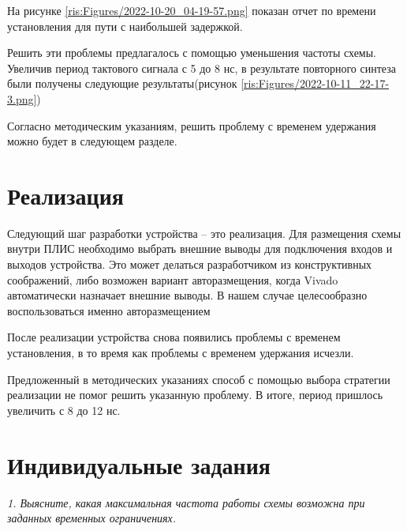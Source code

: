 \begin{sloppypar}
На рисунке \ref{ris:Figures/2022-10-20_04-19-57.png} показан отчет по времени установления для пути с наибольшей задержкой.

Решить эти проблемы предлагалось с помощью уменьшения частоты схемы. Увеличив период тактового сигнала с 5 до 8 нс, в результате повторного синтеза были получены следующие результаты(рисунок \ref{ris:Figures/2022-10-11_22-17-3.png})




Согласно методическим указаниям, решить проблему с временем удержания можно будет в следующем разделе.

\newpage
\section{Реализация} %
Следующий шаг разработки устройства – это реализация. Для размещения схемы внутри ПЛИС необходимо выбрать внешние выводы для подключения входов и выходов устройства. Это может делаться разработчиком из
конструктивных соображений, либо возможен вариант авторазмещения, когда Vivado автоматически назначает внешние выводы. В нашем случае целесообразно воспользоваться именно авторазмещением


После реализации устройства снова появились проблемы с временем установления, в то время как проблемы с временем удержания исчезли.


Предложенный в методических указаниях способ с помощью выбора стратегии реализации не помог решить указанную проблему. В итоге, период пришлось увеличить с 8 до 12 нс. 
\newpage
\section{Индивидуальные задания}%
\textit {1. Выясните, какая максимальная частота работы схемы возможна при заданных временных ограничениях.}


\end{sloppypar}
